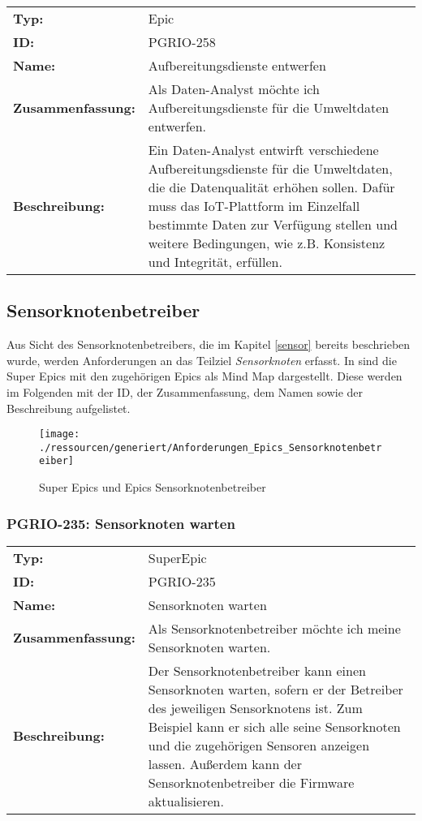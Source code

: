 		\begin{flushleft} 
\begin{tabular}{@{}lp{100mm}} 
\textbf{Typ:} & Epic \\ 
\textbf{ID:} & PGRIO-258 \\ 
\textbf{Name:} & Aufbereitungsdienste entwerfen \\ 
\textbf{Zusammenfassung:} & Als Daten-Analyst möchte ich Aufbereitungsdienste für die Umweltdaten entwerfen. \\ 
\textbf{Beschreibung:} & Ein Daten-Analyst entwirft verschiedene Aufbereitungsdienste für die Umweltdaten, die die Datenqualität erhöhen sollen. Dafür muss das IoT-Plattform im Einzelfall bestimmte Daten zur Verfügung stellen und weitere Bedingungen, wie z.B. Konsistenz und Integrität, erfüllen. \\ 
\end{tabular} 
\end{flushleft} 

\subsection{Sensorknotenbetreiber}
Aus Sicht des Sensorknotenbetreibers, die im Kapitel \ref{sensor} bereits beschrieben wurde, werden Anforderungen an das Teilziel \textit{Sensorknoten} erfasst. In  sind die Super Epics mit den zugehörigen Epics als Mind Map dargestellt. Diese werden im Folgenden mit der ID, der Zusammenfassung, dem Namen sowie der Beschreibung aufgelistet.


\begin{figure}[H]
	\centering
	\texttt{[image: ./ressourcen/generiert/Anforderungen\_Epics\_Sensorknotenbetreiber]}
	\caption{Super Epics und Epics Sensorknotenbetreiber}
	\label{fig:SKBEpics}
\end{figure}

\subsubsection{PGRIO-235: Sensorknoten warten} 
\begin{flushleft} 
\begin{tabular}{@{}lp{100mm}} 
\textbf{Typ:} & SuperEpic \\ 
\textbf{ID:} & PGRIO-235 \\ 
\textbf{Name:} & Sensorknoten warten \\ 
\textbf{Zusammenfassung:} & Als Sensorknotenbetreiber möchte ich meine Sensorknoten warten. \\ 
\textbf{Beschreibung:} & Der Sensorknotenbetreiber kann einen Sensorknoten warten, sofern er der Betreiber des jeweiligen Sensorknotens ist. Zum Beispiel kann er sich alle seine Sensorknoten und die zugehörigen Sensoren anzeigen lassen. Außerdem kann der Sensorknotenbetreiber die Firmware aktualisieren. \\ 
\end{tabular} 
\end{flushleft} 

